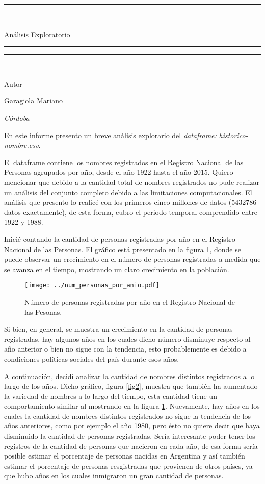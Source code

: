 \documentclass[10pt,a4paper]{article}
\newcommand{\titleGP}{\begingroup %
\centering %
\vspace*{\baselineskip} %

\rule{\textwidth}{1.6pt}\vspace*{-\baselineskip}\vspace*{2pt} %
\rule{\textwidth}{0.4pt}\\[\baselineskip] %

{\LARGE An\'alisis Exploratorio}\\[0.2\baselineskip] %

\rule{\textwidth}{0.4pt}\vspace*{-\baselineskip}\vspace{3.2pt} %
\rule{\textwidth}{1.6pt}\\[\baselineskip] %

\scshape %

\vspace*{10\baselineskip}

Autor \\[\baselineskip]
{\LARGE Garagiola Mariano\par}


\vspace*{1.5\baselineskip}
{\itshape C\'ordoba \par}

\vfill

\endgroup}
\begin{document}
 \pagestyle{empty}
 \titleGP
 
 \newpage
 
 En este informe presento un breve an\'alisis explorario del {\em dataframe:} {\em historico-nombre.csv}.
 
El dataframe contiene los nombres registrados en el Registro Nacional de 
las Personas agrupados por a\~no, desde el a\~no 1922 hasta el a\~no 2015. Quiero 
mencionar que debido a la cantidad total de nombres registrados no pude realizar un 
an\'alisis del conjunto completo debido a las limitaciones computacionales. El 
an\'alisis que presento lo realic\'e con los primeros cinco millones de datos 
(5432786 datos exactamente), de esta 
forma, cubro el periodo temporal comprendido entre 1922 y 1988.

Inici\'e contando la cantidad de personas registradas por a\~no en 
el Registro Nacional de las Personas. El gr\'afico est\'a presentado en la figura 
\ref{fig1}, donde se puede observar un crecimiento en el n\'umero de personas registradas 
a medida que se avanza en el tiempo, mostrando un claro crecimiento en la poblaci\'on.

\begin{figure}[h!]
\begin{center}
\texttt{[image: ../num\_personas\_por\_anio.pdf]}
\end{center}
\caption{\label{fig1} N\'umero de personas registradas por a\~no en el Registro 
Nacional de las Pesonas.}
\end{figure}

\noindent Si bien, en general, se muestra un crecimiento en la cantidad de personas 
registradas, hay algunos a\~nos en los cuales dicho n\'umero disminuye respecto al 
a\~no anterior o bien no sigue con la tendencia, esto probablemente es debido a 
condiciones pol\'iticas-sociales del pa\'is durante esos a\~nos.

A continuaci\'on, decid\'i analizar la cantidad de nombres distintos registrados a lo 
largo de los a\~nos. Dicho gr\'afico, figura \ref{fig2}, muestra que tambi\'en ha 
aumentado la variedad de nombres a lo largo del tiempo, esta cantidad tiene un 
comportamiento similar al mostrando en la figura \ref{fig1}. Nuevamente, hay a\~nos en 
los cuales la cantidad de nombres distintos registrados no sigue la tendencia de los 
a\~nos anteriores, como por ejemplo el a\~no 1980, pero \'esto no quiere decir que 
haya disminuido la cantidad de personas registradas. Ser\'ia interesante poder tener 
los registros de la cantidad de personas que nacieron en cada a\~no, de esa forma 
ser\'ia posible estimar el porcentaje de personas nacidas en Argentina y as\'i tambi\'en 
estimar el porcentaje de personas resgistradas que provienen de otros pa\'ises, ya que 
hubo a\~nos en los cuales inmigraron un gran cantidad de personas.
\end{document}
